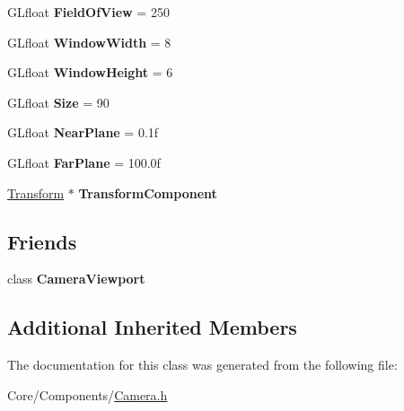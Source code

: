 \begin{DoxyCompactItemize}
\item 
\hypertarget{classDCEngine_1_1Components_1_1Camera_ae39daf64c16eed8722b06b3f298f59b2}{G\-Lfloat {\bfseries Field\-Of\-View} = 250}\label{classDCEngine_1_1Components_1_1Camera_ae39daf64c16eed8722b06b3f298f59b2}

\item 
\hypertarget{classDCEngine_1_1Components_1_1Camera_afce6a46766da72932e4c520ba5819a41}{G\-Lfloat {\bfseries Window\-Width} = 8}\label{classDCEngine_1_1Components_1_1Camera_afce6a46766da72932e4c520ba5819a41}

\item 
\hypertarget{classDCEngine_1_1Components_1_1Camera_a50aa6cd802041e51dfa588489e345662}{G\-Lfloat {\bfseries Window\-Height} = 6}\label{classDCEngine_1_1Components_1_1Camera_a50aa6cd802041e51dfa588489e345662}

\item 
\hypertarget{classDCEngine_1_1Components_1_1Camera_a1a2cdf44bfe50f5c29af04ae084beb17}{G\-Lfloat {\bfseries Size} = 90}\label{classDCEngine_1_1Components_1_1Camera_a1a2cdf44bfe50f5c29af04ae084beb17}

\item 
\hypertarget{classDCEngine_1_1Components_1_1Camera_a964822aa1b2029bacd469e59a00b97d3}{G\-Lfloat {\bfseries Near\-Plane} = 0.\-1f}\label{classDCEngine_1_1Components_1_1Camera_a964822aa1b2029bacd469e59a00b97d3}

\item 
\hypertarget{classDCEngine_1_1Components_1_1Camera_abb5fb7e37ffd7ae9df6f5163732b8f27}{G\-Lfloat {\bfseries Far\-Plane} = 100.\-0f}\label{classDCEngine_1_1Components_1_1Camera_abb5fb7e37ffd7ae9df6f5163732b8f27}

\item 
\hypertarget{classDCEngine_1_1Components_1_1Camera_ae433fad9d7fba93fa411d0999882602c}{\hyperlink{classDCEngine_1_1Components_1_1Transform}{Transform} $\ast$ {\bfseries Transform\-Component}}\label{classDCEngine_1_1Components_1_1Camera_ae433fad9d7fba93fa411d0999882602c}

\end{DoxyCompactItemize}
\subsection*{Friends}
\begin{DoxyCompactItemize}
\item 
\hypertarget{classDCEngine_1_1Components_1_1Camera_a9634ae1550d5c7bd5b7cc67eb933ec91}{class {\bfseries Camera\-Viewport}}\label{classDCEngine_1_1Components_1_1Camera_a9634ae1550d5c7bd5b7cc67eb933ec91}

\end{DoxyCompactItemize}
\subsection*{Additional Inherited Members}


The documentation for this class was generated from the following file\-:\begin{DoxyCompactItemize}
\item 
Core/\-Components/\hyperlink{Camera_8h}{Camera.\-h}\end{DoxyCompactItemize}
